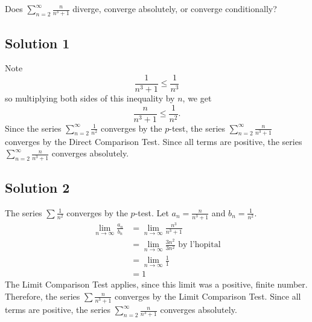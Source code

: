 \documentclass{article}
\begin{document}
\noindent
Does $\displaystyle \sum_{n=2}^\infty \frac{n}{n^3+1}$
diverge, converge absolutely, or converge conditionally?

\subsection*{Solution 1}

Note
\[ \frac{1}{n^3+1} \leq \frac1{n^3}\]
so multiplying both sides of this inequality by $n$, we get
\[ \frac{n}{n^3+1} \leq \frac1{n^2}.\]
Since the series $\displaystyle \sum_{n=2}^\infty \frac{1}{n^2}$ converges by the $p$-test, the series $\displaystyle \sum_{n=2}^\infty \frac{n}{n^3+1}$ converges by the Direct Comparison Test.
Since all terms are positive, the series $\displaystyle \sum_{n=2}^\infty \frac{n}{n^3+1}$ converges absolutely.


\subsection*{Solution 2}


The series $\sum \frac1{n^2}$ converges by the $p$-test. Let $a_n = \frac{n}{n^3+1}$ and $b_n = \frac1{n^2}$.
\begin{align*}
\lim_{n \to \infty} \frac{a_n}{b_n}
&= \lim_{n \to \infty} \frac{n^3}{n^3+1}\\
&= \lim_{n \to \infty} \frac{3n^2}{3n^2} \text{ by l'hopital}\\
&= \lim_{n \to \infty} \frac{1}{1}\\
&= 1
\end{align*}
The Limit Comparison Test applies, since this limit was a positive, finite number. Therefore, the series $\sum \frac{n}{n^3+1}$ converges by the Limit Comparison Test.
 Since all terms are positive, the series $\displaystyle \sum_{n=2}^\infty \frac{n}{n^3+1}$ converges absolutely.
\end{document}

